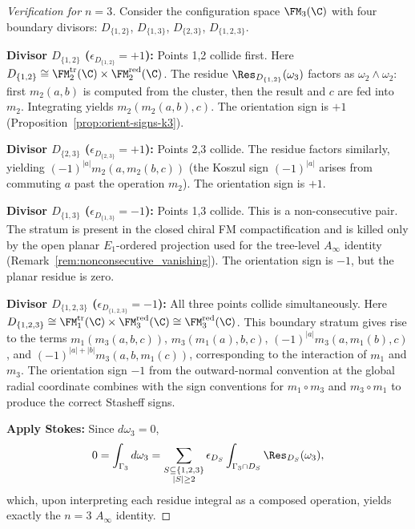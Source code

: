 \begin{proof}[Verification for $n=3$]
Consider the configuration space $\FM_3(\C)$ with four boundary divisors: $D_{\{1,2\}}$, $D_{\{1,3\}}$, $D_{\{2,3\}}$, $D_{\{1,2,3\}}$.

\textbf{Divisor $D_{\{1,2\}}$ ($\epsilon_{D_{\{1,2\}}} = +1$):}
Points 1,2 collide first. Here
\(D_{\{1,2\}}\cong
\FM_2^{\mathrm{tr}}(\C)\times\FM_2^{\mathrm{red}}(\C)\). The residue
\(\Res_{D_{\{1,2\}}}(\omega_3)\) factors as
\(\omega_2\wedge\omega_2\): first \(m_2(a,b)\) is computed from the
cluster, then the result and \(c\) are fed into \(m_2\). Integrating
yields \(m_2(m_2(a,b),c)\). The orientation sign is \(+1\)
(Proposition~\ref{prop:orient-signs-k3}).

\textbf{Divisor $D_{\{2,3\}}$ ($\epsilon_{D_{\{2,3\}}} = +1$):} Points 2,3 collide. The residue factors similarly, yielding $(-1)^{|a|} m_2(a, m_2(b,c))$ (the Koszul sign $(-1)^{|a|}$ arises from commuting $a$ past the operation $m_2$). The orientation sign is $+1$.

\textbf{Divisor $D_{\{1,3\}}$ ($\epsilon_{D_{\{1,3\}}} = -1$):}
Points 1,3 collide. This is a non-consecutive pair. The stratum is
present in the closed chiral FM compactification and is killed only by
the open planar \(E_1\)-ordered projection used for the tree-level
\(A_\infty\) identity (Remark~\ref{rem:nonconsecutive_vanishing}).
The orientation sign is \(-1\), but the planar residue is zero.

\textbf{Divisor $D_{\{1,2,3\}}$ ($\epsilon_{D_{\{1,2,3\}}} = -1$):}
All three points collide simultaneously. Here
\(D_{\{1,2,3\}}\cong
\FM_1^{\mathrm{tr}}(\C)\times\FM_3^{\mathrm{red}}(\C)
\cong \FM_3^{\mathrm{red}}(\C)\). This boundary stratum gives rise to
the terms \(m_1(m_3(a,b,c))\),
\(m_3(m_1(a),b,c)\), \((-1)^{|a|}m_3(a,m_1(b),c)\), and
\((-1)^{|a|+|b|}m_3(a,b,m_1(c))\), corresponding to the interaction of
\(m_1\) and \(m_3\). The orientation sign \(-1\) from the
outward-normal convention at the global radial coordinate combines
with the sign conventions for \(m_1\circ m_3\) and \(m_3\circ m_1\)
to produce the correct Stasheff signs.

\textbf{Apply Stokes:} Since $d\omega_3 = 0$,
\[
0 = \int_{\Gamma_3} d\omega_3 = \sum_{\substack{S \subseteq \{1,2,3\} \\ |S| \geq 2}} \epsilon_{D_S} \int_{\Gamma_3 \cap D_S} \Res_{D_S}(\omega_3),
\]
which, upon interpreting each residue integral as a composed operation, yields exactly the $n=3$ $A_\infty$ identity.
\end{proof}

